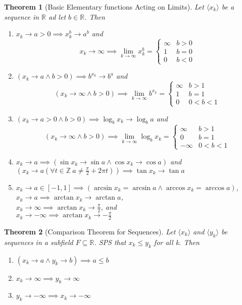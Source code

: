 \documentclass[11pt, oneside]{book}
\theoremstyle{break}
\newtheorem{thm}{Theorem}[section]
\newcommand{\bb}[1]{\mathbb{#1}}		%
\begin{document}
\begin{thm}[Basic Elementary functions Acting on Limits]
	Let $\langle x_k \rangle$ be a sequence in $\bb{R}$ ad let $b \in \bb{R}$. Then
	\begin{enumerate}
		\item $x_k \to a > 0 \implies x_k^b \to a^b$ and \\
			\[
				x_k \to \infty \implies \lim_{k \to \infty} x_k^b =
				\begin{cases}
					\infty 	& b > 0 \\
					1		& b = 0 \\
					0 		& b < 0
				\end{cases}
			\]
		\item $(x_k \to a \land b > 0) \implies b^{x_k} \to b^a$ and \\
			\[
				(x_k \to \infty \land b > 0) \implies \lim_{k \to \infty} b^{x_k} =
				\begin{cases}
					\infty 	& b > 1 \\
					1		& b = 1 \\
					0		& 0 < b < 1
				\end{cases}
			\]
		\item $(x_k \to a > 0 \land b > 0) \implies \log_b x_k \to \log_b a$ and \\
			\[
				(x_k \to \infty \land b > 0) \implies \lim_{k \to \infty} \log_b x_k = 
				\begin{cases}
					\infty 	& b > 1 \\
					0		& b = 1 \\
					-\infty & 0 < b < 1
				\end{cases}
			\]
		\item $x_k \to a \implies (\sin x_k \to \sin a \land \cos x_k \to \cos a)$ and \\
			  $(x_k \to a (\forall t \in \bb{Z} \> a \neq \frac{\pi}{2} + 2 \pi t)) \implies \tan x_k \to \tan a$
		\item $x_k \to a \in [-1, 1] \implies (\arcsin x_k = \arcsin a \land \arccos x_k = \arccos a)$, \\
			  $x_k \to a \implies \arctan x_k \to \arctan a$, \\
			  $x_k \to \infty \implies \arctan x_k \to \frac{\pi}{2}$, and \\
			  $x_k \to -\infty \implies \arctan x_k \to -\frac{\pi}{2}$
	\end{enumerate}
\end{thm}

\begin{thm}[Comparison Theorem for Sequences]
	Let $\langle x_k \rangle$ and $\langle y_k \rangle$ be sequences in a subfield $F \subseteq \bb{R}$. SPS that $x_k \leq y_k$ for all k. Then
	\begin{enumerate}
		\item $(x_k \to a \land y_k \to b) \implies a \leq b$
		\item $x_k \to \infty \implies y_k \to \infty$
		\item $y_k \to -\infty \implies x_k \to -\infty$
	\end{enumerate}
\end{thm}
\end{document}
